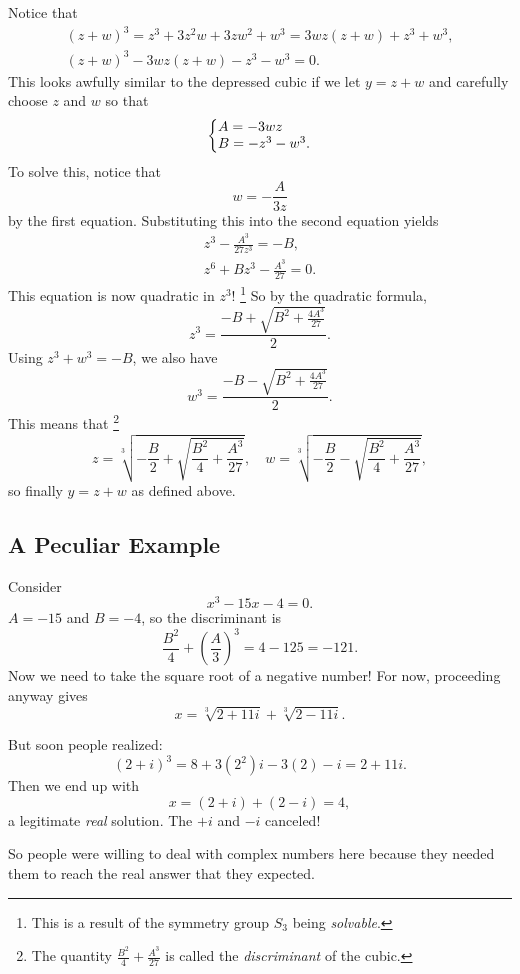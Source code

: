 Notice that
\begin{gather*}
  (z + w)^3 = z^3 + 3z^2w + 3zw^2 + w^3 = 3wz(z + w) + z^3 + w^3, \\
  (z + w)^3 - 3wz(z + w) - z^3 - w^3 = 0.
\end{gather*}
This looks awfully similar to the depressed cubic if
we let $y = z + w$ and carefully choose $z$ and $w$
so that
\[
\left\{\begin{array}{@{}l@{}}
  A = -3wz \\
  B = -z^3 - w^3.
\end{array}\right.
\] 
To solve this, notice that
\[w = -\frac{A}{3z}\]
by the first equation. Substituting this into the second
equation yields
\begin{gather*}
  z^3 - \frac{A^3}{27z^3} = -B, \\
  z^6 + Bz^3 - \frac{A^3}{27} = 0.
\end{gather*}
This equation is now quadratic in $z^3$!
\footnote{This is a result of the symmetry group $S_3$ being \textit{solvable}.}
So by the quadratic formula,
\[
  z^3 = \frac{-B + \sqrt{B^2 + \frac{4A^3}{27}}}{2}
.\] 
Using $z^3 + w^3 = -B$, we also have
\[
  w^3 = \frac{-B - \sqrt{B^2 + \frac{4A^3}{27}}}{2}
.\] 
This means that
\footnote{The quantity $\frac{B^2}{4} + \frac{A^3}{27}$ is called the \textit{discriminant} of the cubic.}
\[
  z = \sqrt[3]{-\frac{B}{2} + \sqrt{\frac{B^2}{4} + \frac{A^3}{27}}}, \quad
  w = \sqrt[3]{-\frac{B}{2} - \sqrt{\frac{B^2}{4} + \frac{A^3}{27}}},
\]
so finally $y = z + w$ as defined above.

\subsection{A Peculiar Example}
Consider
\[x^3 - 15x - 4 = 0.\]
$A = -15$ and $B = -4$, so the discriminant is
 \[
\frac{B^2}{4} + \left(\frac{A}{3}\right)^3 = 4 - 125 = -121
.\]
Now we need to take the square root of a negative
number! For now, proceeding anyway gives
\[
x = \sqrt[3]{2 + 11i} + \sqrt[3]{2 - 11i}
.\] 

But soon people realized:
\[
  (2 + i)^3 = 8 + 3(2^2)i - 3(2) - i = 2 + 11i
.\] 
Then we end up with
\[x = (2 + i) + (2 - i) = 4,\]
a legitimate \textit{real} solution. The $+i$ and $-i$
canceled!

So people were willing to deal with complex
numbers here because they needed them to reach the real
answer that they expected.
